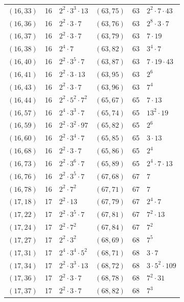 \documentclass[11pt]{article}
\begin{document}
\begin{longtable}{@{}lrl@{\qquad}lrl@{}}
$(16,33)$ & 16 & $2^{2}\cdot 3^{3}\cdot 13$ & $(63,75)$ & 63 & $2^{2}\cdot 7\cdot 43$\\
$(16,36)$ & 16 & $2^{2}\cdot 3\cdot 7$ & $(63,76)$ & 63 & $2^{8}\cdot 3\cdot 7$\\
$(16,37)$ & 16 & $2^{2}\cdot 3\cdot 7$ & $(63,79)$ & 63 & $7\cdot 19$\\
$(16,38)$ & 16 & $2^{4}\cdot 7$ & $(63,82)$ & 63 & $3^{4}\cdot 7$\\
$(16,40)$ & 16 & $2^{2}\cdot 3^{5}\cdot 7$ & $(63,87)$ & 63 & $7\cdot 19\cdot 43$\\
$(16,41)$ & 16 & $2^{2}\cdot 3\cdot 13$ & $(63,95)$ & 63 & $2^{6}$\\
$(16,43)$ & 16 & $2^{2}\cdot 3\cdot 7$ & $(63,96)$ & 63 & $7^{4}$\\
$(16,44)$ & 16 & $2^{2}\cdot 5^{2}\cdot 7^{2}$ & $(65,67)$ & 65 & $7\cdot 13$\\
$(16,57)$ & 16 & $2^{4}\cdot 3^{3}\cdot 7$ & $(65,74)$ & 65 & $13^{2}\cdot 19$\\
$(16,59)$ & 16 & $2^{2}\cdot 3^{2}\cdot 97$ & $(65,82)$ & 65 & $2^{6}$\\
$(16,60)$ & 16 & $2^{2}\cdot 3^{4}\cdot 7$ & $(65,85)$ & 65 & $3\cdot 13$\\
$(16,68)$ & 16 & $2^{2}\cdot 3\cdot 7$ & $(65,86)$ & 65 & $2^{4}$\\
$(16,73)$ & 16 & $2^{2}\cdot 3^{6}\cdot 7$ & $(65,89)$ & 65 & $2^{4}\cdot 7\cdot 13$\\
$(16,76)$ & 16 & $2^{2}\cdot 3^{5}\cdot 7$ & $(67,68)$ & 67 & $7$\\
$(16,78)$ & 16 & $2^{2}\cdot 7^{2}$ & $(67,71)$ & 67 & $7$\\
$(17,18)$ & 17 & $2^{2}\cdot 13$ & $(67,79)$ & 67 & $2^{4}\cdot 7$\\
$(17,22)$ & 17 & $2^{2}\cdot 3^{5}\cdot 7$ & $(67,81)$ & 67 & $7^{2}\cdot 13$\\
$(17,24)$ & 17 & $2^{2}\cdot 7^{2}$ & $(67,84)$ & 67 & $7^{2}$\\
$(17,27)$ & 17 & $2^{2}\cdot 3^{2}$ & $(68,69)$ & 68 & $7^{5}$\\
$(17,31)$ & 17 & $2^{4}\cdot 3^{4}\cdot 5^{2}$ & $(68,71)$ & 68 & $3\cdot 7$\\
$(17,34)$ & 17 & $2^{2}\cdot 3^{3}\cdot 13$ & $(68,72)$ & 68 & $3\cdot 5^{2}\cdot 109$\\
$(17,36)$ & 17 & $2^{2}\cdot 3\cdot 7$ & $(68,78)$ & 68 & $7^{2}\cdot 31$\\
$(17,37)$ & 17 & $2^{2}\cdot 3\cdot 7$ & $(68,82)$ & 68 & $7^{3}$\\

\end{longtable}
\end{document}
